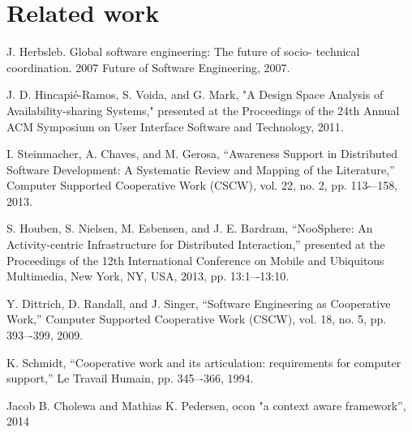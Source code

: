 \documentclass{sigchi}
\begin{document}
\section{Related work}

J. Herbsleb. Global software engineering: The future of socio- technical coordination. 2007 Future of Software Engineering, 2007.

J. D. Hincapié-Ramos, S. Voida, and G. Mark, "A Design Space Analysis of Availability-sharing Systems," presented at the Proceedings of the 24th Annual ACM Symposium on User Interface Software and Technology, 2011.

I. Steinmacher, A. Chaves, and M. Gerosa, “Awareness Support in Distributed Software Development: A Systematic Review and Mapping of the Literature,” Computer Supported Cooperative Work (CSCW), vol. 22, no. 2, pp. 113-–158, 2013.

S. Houben, S. Nielsen, M. Esbensen, and J. E. Bardram, “NooSphere: An Activity-centric Infrastructure for Distributed Interaction,” presented at the Proceedings of the 12th International Conference on Mobile and Ubiquitous Multimedia, New York, NY, USA, 2013, pp. 13:1–-13:10.

Y. Dittrich, D. Randall, and J. Singer, “Software Engineering as Cooperative Work,” Computer Supported Cooperative Work (CSCW), vol. 18, no. 5, pp. 393–-399, 2009.

K. Schmidt, “Cooperative work and its articulation: requirements for computer support,” Le Travail Humain, pp. 345–-366, 1994.

Jacob B. Cholewa and Mathias K. Pedersen, ocon "a context aware framework”, 2014


%
%

\end{document}
